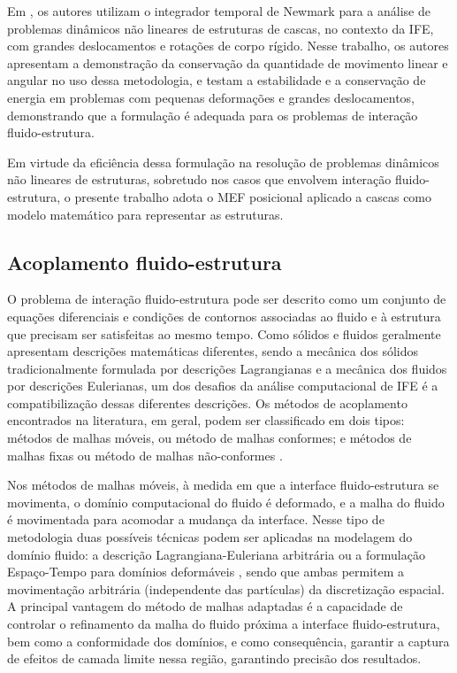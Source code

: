 Em , os autores utilizam o integrador temporal de Newmark para a análise de problemas dinâmicos não lineares de estruturas de cascas, no contexto da IFE, com grandes deslocamentos e rotações de corpo rígido. Nesse trabalho, os autores apresentam a demonstração da conservação da quantidade de movimento linear e angular no uso dessa metodologia, e testam a estabilidade e a conservação de energia em problemas com pequenas deformações e grandes deslocamentos, demonstrando que a formulação é adequada para os problemas de interação fluido-estrutura.

Em virtude da eficiência dessa formulação na resolução de problemas dinâmicos não lineares de estruturas, sobretudo nos casos que envolvem interação fluido-estrutura, o presente trabalho adota o MEF posicional aplicado a cascas como modelo matemático para representar as estruturas.

\subsection{Acoplamento fluido-estrutura}
\label{couplingsection}

O problema de interação fluido-estrutura pode ser descrito como um conjunto de equações diferenciais e condições de contornos associadas ao fluido e à estrutura que precisam ser satisfeitas ao mesmo tempo. Como sólidos e fluidos geralmente apresentam descrições matemáticas diferentes, sendo a mecânica dos sólidos tradicionalmente formulada por descrições Lagrangianas e a mecânica dos fluidos por descrições Eulerianas, um dos desafios da análise computacional de IFE é a compatibilização dessas diferentes descrições. Os métodos de acoplamento encontrados na literatura, em geral, podem ser classificado em dois tipos: métodos de malhas móveis, ou método de malhas conformes; e métodos de malhas fixas ou método de malhas não-conformes \cite{BazilevsTT:2013b,Houetal:2012}.

Nos métodos de malhas móveis, à medida em que a interface fluido-estrutura se movimenta, o domínio computacional do fluido é deformado, e a malha do fluido é movimentada para acomodar a mudança da interface. Nesse tipo de metodologia duas possíveis técnicas podem ser aplicadas na modelagem do domínio fluido: a descrição Lagrangiana-Euleriana arbitrária \cite{DoneaGH:1982,HughesLZ:1981,KanchiM:2007} ou a formulação Espaço-Tempo para domínios deformáveis \cite{TakizawaT:2012,TezduyarBL:1992,TezduyarBML:1992b}, sendo que ambas permitem a movimentação arbitrária (independente das partículas) da discretização espacial. A principal vantagem do método de malhas adaptadas é a capacidade de controlar o refinamento da malha do fluido próxima a interface fluido-estrutura, bem como a conformidade dos domínios, e como consequência, garantir a captura de efeitos de camada limite nessa região, garantindo precisão dos resultados.

